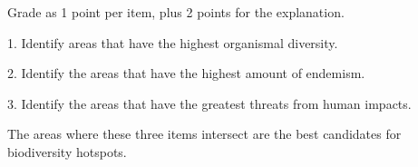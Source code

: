 \documentclass[11pt, addpoints]{exam}
\newenvironment{AnswerPage}[1]
    {\begin{minipage}[t][#1]{0.92\textwidth}%
    \begin{solution}}
    {\end{solution}\end{minipage}
    \vspace*{\stretch{1}}}
\newlength{\basespace}
\begin{document}
{\begin{questions}
\begin{AnswerPage}{4\basespace}%
	
	Grade as 1 point per item, plus 2 points for the explanation.\vspace{\baselineskip}
	
	1. Identify areas that have the highest organismal diversity.
	
	2. Identify the areas that have the highest amount of endemism.
	
	3. Identify the areas that have the greatest threats from human impacts.
	
	The areas where these three items intersect are the best candidates for biodiversity hotspots.
\end{AnswerPage}

\vfill




\end{questions}
}
\end{document}
